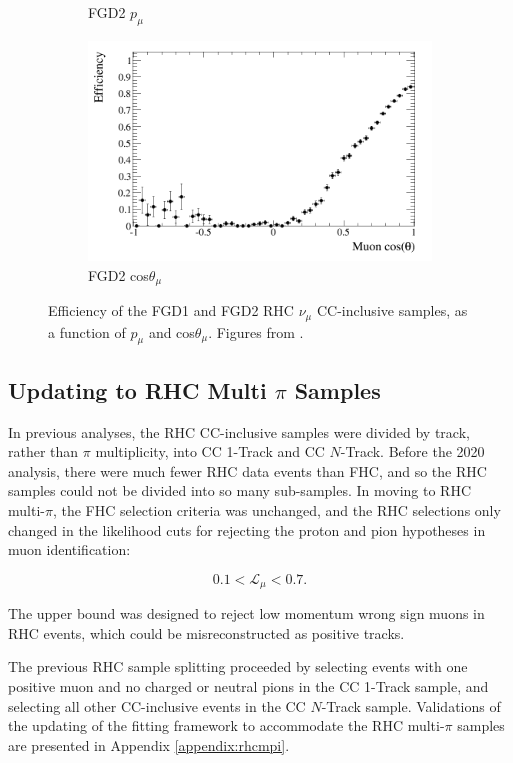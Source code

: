 \begin{figure}
\begin{subfigure}{.49\textwidth}
  \caption{FGD2 $p_{\mu}$}
\end{subfigure}
\begin{subfigure}{.49\textwidth}
  \centering
  \includegraphics[width=1.0\linewidth]{figs/effcosfgd2nuinnubar}
  \caption{FGD2 cos$\theta_{\mu}$}
\end{subfigure}
\caption{Efficiency of the FGD1 and FGD2 RHC $\nu_{\mu}$ CC-inclusive samples, as a function of $p_{\mu}$ and cos$\theta_{\mu}$. Figures from \cite{tn224}.}
\label{fig:nuinnubareff}
\end{figure}

\subsection{Updating to RHC Multi $\pi$ Samples}

In previous analyses, the RHC CC-inclusive samples were divided by track, rather than $\pi$ multiplicity, into CC 1-Track and CC $N$-Track. Before the 2020 analysis, there were much fewer RHC data events than FHC, and so the RHC samples could not be divided into so many sub-samples. In moving to RHC multi-$\pi$, the FHC selection criteria was unchanged, and the RHC selections only changed in the likelihood cuts for rejecting the proton and pion hypotheses in muon identification:

\begin{equation}
0.1 < \mathcal{L}_{\mu} < 0.7.
\end{equation}

The upper bound was designed to reject low momentum wrong sign muons in RHC events, which could be misreconstructed as positive tracks.

The previous RHC sample splitting proceeded by selecting events with one positive muon and no charged or neutral pions in the CC 1-Track sample, and selecting all other CC-inclusive events in the CC $N$-Track sample. Validations of the updating of the fitting framework to accommodate the RHC multi-$\pi$ samples are presented in Appendix \ref{appendix:rhcmpi}.

